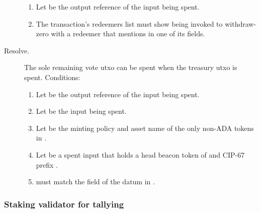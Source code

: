 \documentclass[../hydrozoa.tex]{subfiles}
\begin{document}
\begin{description}
\begin{enumerate}
      \item Let  be the output reference of the input being spent.
      \item The transaction's redeemers list must show  being invoked to withdraw-zero with a redeemer that mentions  in one of its fields.
    \end{enumerate}
  \item[Resolve.] The sole remaining vote utxo can be spent when the treasury utxo is spent.
    Conditions:
    \begin{enumerate}
      \item Let  be the output reference of the input being spent.
      \item Let  be the input being spent.
      \item Let  be the minting policy and asset name of the only non-ADA tokens in .
      \item Let  be a spent input that holds a head beacon token of  and CIP-67 prefix .
      \item {} must match the  field of the  datum in .
  \end{enumerate}
\end{description}

\subsubsection{Staking validator for tallying}
\end{document}
